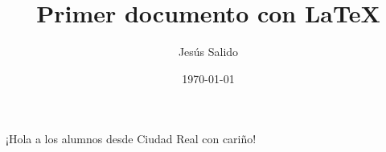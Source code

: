 \documentclass{article}
\title{Primer documento con \LaTeX}
\author{Jesús Salido}
\date{\today}
\begin{document}
\maketitle

¡Hola a los alumnos desde Ciudad Real con cariño!
\end{document}
